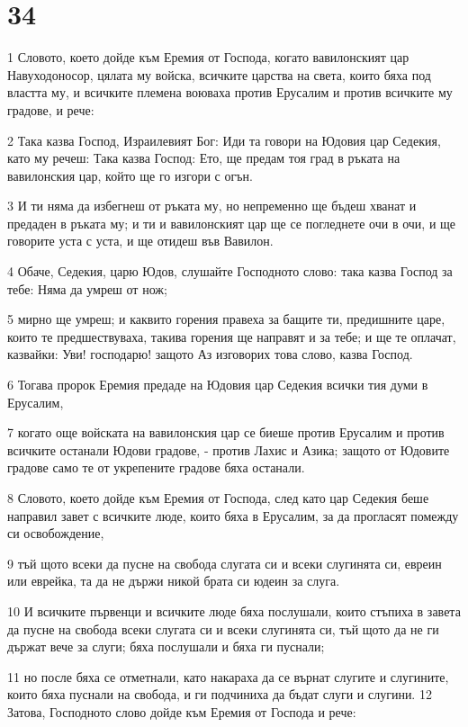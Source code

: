 \chapter{34}

\par 1 Словото, което дойде към Еремия от Господа, когато вавилонският цар Навуходоносор, цялата му войска, всичките царства на света, които бяха под властта му, и всичките племена воюваха против Ерусалим и против всичките му градове, и рече:
\par 2 Така казва Господ, Израилевият Бог: Иди та говори на Юдовия цар Седекия, като му речеш: Така казва Господ: Ето, ще предам тоя град в ръката на вавилонския цар, който ще го изгори с огън.
\par 3 И ти няма да избегнеш от ръката му, но непременно ще бъдеш хванат и предаден в ръката му; и ти и вавилонският цар ще се погледнете очи в очи, и ще говорите уста с уста, и ще отидеш във Вавилон.
\par 4 Обаче, Седекия, царю Юдов, слушайте Господното слово: така казва Господ за тебе: Няма да умреш от нож;
\par 5 мирно ще умреш; и каквито горения правеха за бащите ти, предишните царе, които те предшествуваха, такива горения ще направят и за тебе; и ще те оплачат, казвайки: Уви! господарю! защото Аз изговорих това слово, казва Господ.
\par 6 Тогава пророк Еремия предаде на Юдовия цар Седекия всички тия думи в Ерусалим,
\par 7 когато още войската на вавилонския цар се биеше против Ерусалим и против всичките останали Юдови градове, - против Лахис и Азика; защото от Юдовите градове само те от укрепените градове бяха останали.
\par 8 Словото, което дойде към Еремия от Господа, след като цар Седекия беше направил завет с всичките люде, които бяха в Ерусалим, за да прогласят помежду си освобождение,
\par 9 тъй щото всеки да пусне на свобода слугата си и всеки слугинята си, евреин или еврейка, та да не държи никой брата си юдеин за слуга.
\par 10 И всичките първенци и всичките люде бяха послушали, които стъпиха в завета да пусне на свобода всеки слугата си и всеки слугинята си, тъй щото да не ги държат вече за слуги; бяха послушали и бяха ги пуснали;
\par 11 но после бяха се отметнали, като накараха да се върнат слугите и слугините, които бяха пуснали на свобода, и ги подчиниха да бъдат слуги и слугини. 12 Затова, Господното слово дойде към Еремия от Господа и рече:
